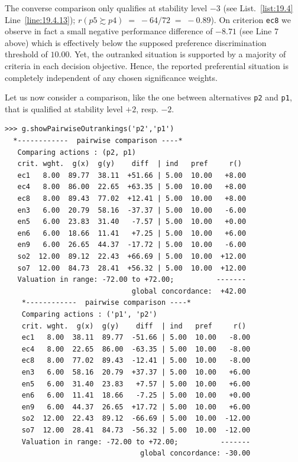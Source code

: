 The converse comparison only qualifies at stability level $-3$ (see List.~\vref{list:19.4} Line~\ref{line:19.4.13}); $r(p5 \succsim p4)\; =\; -64/72\; =\; -0.89$). On criterion \texttt{ec8} we observe in fact a small negative performance difference of $-8.71$ (see Line 7 above) which is effectively below the supposed preference discrimination threshold of $10.00$. Yet, the outranked situation is supported by a majority of criteria in each decision objective. Hence, the reported preferential situation is completely independent of any chosen significance weights.

Let us now consider a comparison, like the one between alternatives \texttt{p2} and \texttt{p1}, that is qualified at stability level $+2$, resp. $-2$.
\begin{lstlisting}[caption={Comparison of alternatives \texttt{p2} and \texttt{p1}},label=list:19.5]
>>> g.showPairwiseOutrankings('p2','p1')
  *------------  pairwise comparison ----*
   Comparing actions : (p2, p1)
   crit. wght.  g(x)  g(y)    diff  | ind   pref     r()
   ec1   8.00  89.77  38.11  +51.66 | 5.00  10.00   +8.00
   ec4   8.00  86.00  22.65  +63.35 | 5.00  10.00   +8.00
   ec8   8.00  89.43  77.02  +12.41 | 5.00  10.00   +8.00
   en3   6.00  20.79  58.16  -37.37 | 5.00  10.00   -6.00
   en5   6.00  23.83  31.40   -7.57 | 5.00  10.00   +0.00
   en6   6.00  18.66  11.41   +7.25 | 5.00  10.00   +6.00
   en9   6.00  26.65  44.37  -17.72 | 5.00  10.00   -6.00
   so2  12.00  89.12  22.43  +66.69 | 5.00  10.00  +12.00
   so7  12.00  84.73  28.41  +56.32 | 5.00  10.00  +12.00
   Valuation in range: -72.00 to +72.00;          -------
                              global concordance:  +42.00
    *------------  pairwise comparison ----*
    Comparing actions : ('p1', 'p2')
    crit. wght.  g(x)  g(y)    diff  | ind   pref     r()
    ec1   8.00  38.11  89.77  -51.66 | 5.00  10.00   -8.00
    ec4   8.00  22.65  86.00  -63.35 | 5.00  10.00   -8.00
    ec8   8.00  77.02  89.43  -12.41 | 5.00  10.00   -8.00
    en3   6.00  58.16  20.79  +37.37 | 5.00  10.00   +6.00
    en5   6.00  31.40  23.83   +7.57 | 5.00  10.00   +6.00 
    en6   6.00  11.41  18.66   -7.25 | 5.00  10.00   +0.00
    en9   6.00  44.37  26.65  +17.72 | 5.00  10.00   +6.00
    so2  12.00  22.43  89.12  -66.69 | 5.00  10.00  -12.00
    so7  12.00  28.41  84.73  -56.32 | 5.00  10.00  -12.00
    Valuation in range: -72.00 to +72.00;          -------
                                global concordance: -30.00
\end{lstlisting}

